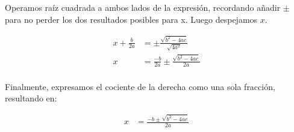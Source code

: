 Operamos raíz cuadrada a ambos lados de la expresión, recordando añadir $\pm$ para no perder los dos resultados posibles para x. Luego despejamos $x$.

\begin{align*}
	x + \frac{b}{2a} &= \pm \frac{\sqrt{b^2 - 4ac}}{\sqrt{4a^2}}\\
	x &= \frac{-b}{2a} \pm \frac{\sqrt{b^2 - 4ac}}{2a}\\
\end{align*}

Finalmente, expresamos el cociente de la derecha como una sola fracción, resultando en:

\begin{align*}
	x &= \frac{-b \pm \sqrt{b^2 - 4ac}}{2a}\\
\end{align*}
